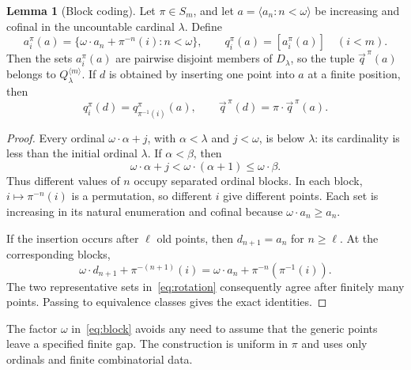 \documentclass[11pt,letterpaper]{article}
\theoremstyle{definition}
\newtheorem{lemma}[definition]{Lemma}
\numberwithin{equation}{section}
\begin{document}
\begin{lemma}[Block coding]\label{lem:blocks}
Let $\pi\in S_m$, and let $a=\langle a_n:n<\omega\rangle$ be increasing and cofinal in the uncountable cardinal $\lambda$. Define
\begin{equation}\label{eq:block}
 a_i^\pi(a)=\{\omega\cdot a_n+\pi^{-n}(i):n<\omega\},
 \qquad q_i^\pi(a)=[a_i^\pi(a)]\quad(i<m).
\end{equation}
Then the sets $a_i^\pi(a)$ are pairwise disjoint members of $D_\lambda$, so the tuple $\vec q^{\,\pi}(a)$ belongs to $Q_\lambda^{\langle m\rangle}$. If $d$ is obtained by inserting one point into $a$ at a finite position, then
\begin{equation}\label{eq:rotation}
 q_i^\pi(d)=q_{\pi^{-1}(i)}^\pi(a),
 \qquad \vec q^{\,\pi}(d)=\pi\cdot\vec q^{\,\pi}(a).
\end{equation}
\end{lemma}
\begin{proof}
Every ordinal $\omega\cdot\alpha+j$, with $\alpha<\lambda$ and $j<\omega$, is below $\lambda$: its cardinality is less than the initial ordinal $\lambda$. If $\alpha<\beta$, then
\[
 \omega\cdot\alpha+j<\omega\cdot(\alpha+1)\leq\omega\cdot\beta.
\]
Thus different values of $n$ occupy separated ordinal blocks. In each block, $i\mapsto\pi^{-n}(i)$ is a permutation, so different $i$ give different points. Each set is increasing in its natural enumeration and cofinal because $\omega\cdot a_n\geq a_n$.

If the insertion occurs after $\ell$ old points, then $d_{n+1}=a_n$ for $n\geq\ell$. At the corresponding blocks,
\[
 \omega\cdot d_{n+1}+\pi^{-(n+1)}(i)
 =\omega\cdot a_n+\pi^{-n}(\pi^{-1}(i)).
\]
The two representative sets in~\eqref{eq:rotation} consequently agree after finitely many points. Passing to equivalence classes gives the exact identities.
\end{proof}

The factor $\omega$ in~\eqref{eq:block} avoids any need to assume that the generic points leave a specified finite gap. The construction is uniform in $\pi$ and uses only ordinals and finite combinatorial data.
\end{document}
